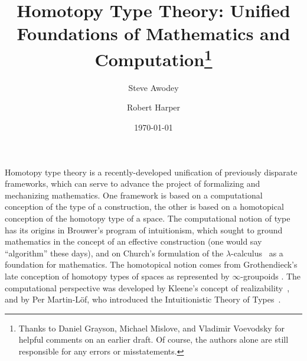 \documentclass[11pt]{article}
\theoremstyle{remark}
\theoremstyle{definition}
\begin{document}

\title{Homotopy Type Theory: Unified Foundations of Mathematics and Computation\thanks{ Thanks to Daniel Grayson,
    Michael Mislove, and Vladimir Voevodsky for helpful comments on an earlier draft.  Of course, the authors alone are
    still responsible for any errors or misstatements.}  } \author{Steve Awodey \and Robert Harper}
\date{\today}
\maketitle


%   
%  
%  
%   
%   
%   
%     
%

\noindent Homotopy type theory is a recently-developed unification of previously disparate frameworks, which can serve
to advance the project of formalizing and mechanizing mathematics.  One framework is based on a computational conception
of the type of a construction, the other is based on a homotopical conception of the homotopy type of a space.  
The computational notion of type has its origins in Brouwer's program of
intuitionism, which sought to ground mathematics in the concept of an effective
construction (one would say ``algorithm'' these days), and on Church's
formulation of the $\lambda$-calculus~\cite{church:lambda} as a foundation for
mathematics. The homotopical notion comes from Grothendieck's late conception of
homotopy types of spaces as represented by $\infty$-groupoids \cite{GrothPS}.
The computational perspective was developed by Kleene's concept of
realizability~\cite{kleene:im}, and by Per Martin-L\"{o}f, who introduced the
Intuitionistic Theory of Types~\cite{mltt}.
\end{document}
